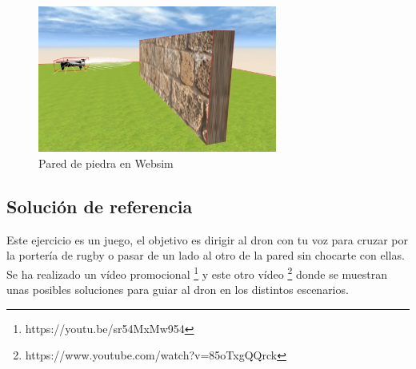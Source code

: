 \begin{figure}[H]
\centering
    \includegraphics[width=0.7\textwidth, height=0.5\textwidth]{chapters/images/pared.png}
    \caption{Pared de piedra en Websim}
    \label{fig:f1}
  \end{figure}



\subsection{Solución de referencia}

Este ejercicio es un juego, el objetivo es dirigir al dron con tu voz para cruzar por la portería de rugby o pasar de un lado al otro de la pared sin chocarte con ellas. Se ha realizado un vídeo promocional \footnote{https://youtu.be/sr54MxMw954} y este otro vídeo \footnote{https://www.youtube.com/watch?v=85oTxgQQrck} donde se muestran unas posibles soluciones para guiar al dron en los distintos escenarios.

